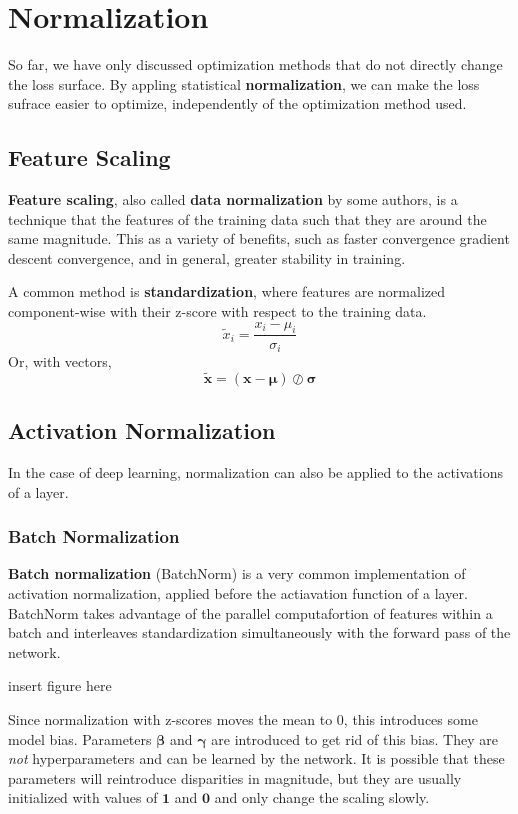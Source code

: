 \documentclass[12pt]{report}
\theoremstyle{definition}
\theoremstyle{remark}
\begin{document}
\section{Normalization}
So far, we have only discussed optimization methods that do not directly change the loss surface. By appling statistical \textbf{normalization}, we can make the loss sufrace easier to optimize, independently of the optimization method used.

\subsection{Feature Scaling}
\textbf{Feature scaling}, also called \textbf{data normalization} by some authors, is a technique that the features of the training data such that they are around the same magnitude. This as a variety of benefits, such as faster convergence gradient descent convergence, and in general, greater stability in training.

A common method is \textbf{standardization}, where features are normalized component-wise with their z-score with respect to the training data.
\begin{equation}
    \tilde{x}_i = \frac{x_i - \mu_i}{\sigma_i}
\end{equation}
Or, with vectors,
\begin{equation}
    \tilde{\mathbf{x}} = (\mathbf{x} - \boldsymbol{\mu}) \oslash \boldsymbol{\sigma}
\end{equation}

\subsection{Activation Normalization}
In the case of deep learning, normalization can also be applied to the activations of a layer.

\subsubsection{Batch Normalization}
\textbf{Batch normalization} (BatchNorm) is a very common implementation of activation normalization, applied before the actiavation function of a layer. BatchNorm takes advantage of the parallel computafortion of features within a batch and interleaves standardization simultaneously with the forward pass of the network.

insert figure here

Since normalization with z-scores moves the mean to $0$, this introduces some model bias. Parameters $\boldsymbol{\beta}$ and $\boldsymbol{\gamma}$ are introduced to get rid of this bias. They are \textit{not} hyperparameters and can be learned by the network. It is possible that these parameters will reintroduce disparities in magnitude, but they are usually initialized with values of $\mathbf{1}$ and $\mathbf{0}$ and only change the scaling slowly.
\end{document}
